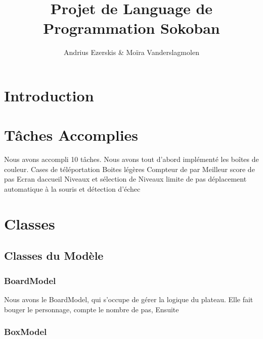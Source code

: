 \documentclass[utf8]{article}
\begin{document}
\begin{titlepage}


\author{Andrius Ezerskis \& Moïra Vanderslagmolen}
\title{Projet de Language de Programmation Sokoban}

\maketitle
\end{titlepage}
\begin{large}

\section{Introduction}
\par
\indent
\par

\section{Tâches Accomplies}
\par
\indent
Nous avons accompli 10 tâches.
Nous avons tout d'abord implémenté les boîtes de couleur.
Cases de téléportation
Boites légères
Compteur de par
Meilleur score de pas
Ecran daccueil
Niveaux et sélection de Niveaux 
limite de pas
déplacement automatique à la souris et détection d'échec


\par


\section{Classes}
\par
\indent

\par
\subsection{Classes du Modèle}

\subsubsection{BoardModel}
\par
\indent
Nous avons le BoardModel, qui s'occupe de gérer la logique du plateau. Elle fait bouger le personnage,
compte le nombre de pas, 
Ensuite
\par
\subsubsection{BoxModel}
\par
\indent
\par

\end{large}
\end{document}
